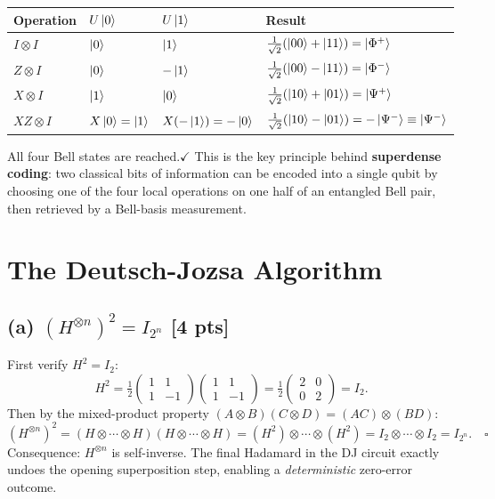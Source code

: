 \documentclass[11pt,a4paper]{article}
\begin{document}
\medskip
\begin{center}
\begin{tabular}{l|l|l|l}
Operation & $U\ket{0}$ & $U\ket{1}$ & Result \\\hline
$I\otimes I$ & $\ket{0}$ & $\ket{1}$ & $\tfrac{1}{\sqrt{2}}(\ket{00}+\ket{11})=\ket{\Phi^+}$ \\[4pt]
$Z\otimes I$ & $\ket{0}$ & $-\ket{1}$ & $\tfrac{1}{\sqrt{2}}(\ket{00}-\ket{11})=\ket{\Phi^-}$ \\[4pt]
$X\otimes I$ & $\ket{1}$ & $\ket{0}$ & $\tfrac{1}{\sqrt{2}}(\ket{10}+\ket{01})=\ket{\Psi^+}$ \\[4pt]
$XZ\otimes I$ & $X\ket{0}=\ket{1}$ & $X(-\ket{1})=-\ket{0}$ & $\tfrac{1}{\sqrt{2}}(\ket{10}-\ket{01})=-\ket{\Psi^-}\equiv\ket{\Psi^-}$
\end{tabular}
\end{center}

\noindent All four Bell states are reached.\;$\checkmark$\;
This is the key principle behind \textbf{superdense coding}: two classical bits of information
can be encoded into a single qubit by choosing one of the four local operations on one half of an
entangled Bell pair, then retrieved by a Bell-basis measurement.

\newpage
\section{The Deutsch-Jozsa Algorithm}

\subsection*{(a) $(H^{\otimes n})^2=I_{2^n}$ [4 pts]}

First verify $H^2=I_2$:
\[
H^2=\tfrac{1}{2}\begin{pmatrix}1&1\\1&-1\end{pmatrix}\begin{pmatrix}1&1\\1&-1\end{pmatrix}
=\tfrac{1}{2}\begin{pmatrix}2&0\\0&2\end{pmatrix}=I_2.
\]
Then by the mixed-product property $(A\otimes B)(C\otimes D)=(AC)\otimes(BD)$:
\[
(H^{\otimes n})^2
=(H\otimes\cdots\otimes H)(H\otimes\cdots\otimes H)
=(H^2)\otimes\cdots\otimes(H^2)
=I_2\otimes\cdots\otimes I_2=I_{2^n}.\quad\square
\]
Consequence: $H^{\otimes n}$ is self-inverse. The final Hadamard in the DJ circuit exactly
undoes the opening superposition step, enabling a \emph{deterministic} zero-error outcome.
\end{document}
